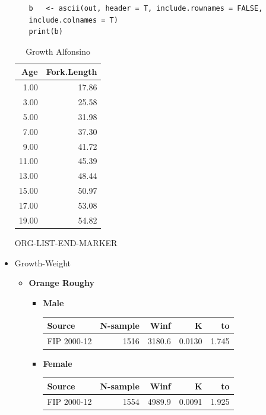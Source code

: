 \documentclass[11pt]{article}
\begin{document}
\begin{itemize}
\begin{itemize}
\begin{verbatim}
b   <- ascii(out, header = T, include.rownames = FALSE, include.colnames = T)
print(b)
\end{verbatim}
\end{itemize}
\begin{table}[htb]
\caption{Growth Alfonsino}
\begin{center}
\begin{tabular}{rr}
   Age  &  Fork.Length  \\
\hline
  1.00  &        17.86  \\
  3.00  &        25.58  \\
  5.00  &        31.98  \\
  7.00  &        37.30  \\
  9.00  &        41.72  \\
 11.00  &        45.39  \\
 13.00  &        48.44  \\
 15.00  &        50.97  \\
 17.00  &        53.08  \\
 19.00  &        54.82  \\
\end{tabular}
\end{center}
\end{table}

ORG-LIST-END-MARKER


\item Growth-Weight
\label{sec-5-1-2-3-3}%
\begin{itemize}
\item \textbf{Orange Roughy}
\begin{itemize}
\item \textbf{Male}

\begin{center}
\begin{tabular}{lrrrr}
 Source       &  N-sample  &    Winf  &       K  &     to  \\
\hline
 FIP 2000-12  &      1516  &  3180.6  &  0.0130  &  1.745  \\
\end{tabular}
\end{center}


\item \textbf{Female}

\begin{center}
\begin{tabular}{lrrrr}
 Source       &  N-sample  &    Winf  &       K  &     to  \\
\hline
 FIP 2000-12  &      1554  &  4989.9  &  0.0091  &  1.925  \\
\end{tabular}
\end{center}



\end{itemize}
\end{itemize}
\end{itemize}
\end{document}
